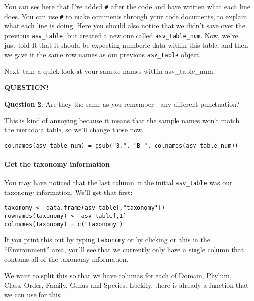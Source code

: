 \documentclass[
]{book}
\newenvironment{bluebox}{
  \definecolor{shadecolor}{RGB}{172, 210, 237}
  \color{white}
  \begin{shaded}}
 {\end{shaded}}
\begin{document}
You can see here that I've added \texttt{\#} after the code and have written what each line does. You can use \texttt{\#} to make comments through your code documents, to explain what each line is doing. Here you should also notice that we didn't save over the previous \texttt{asv\_table}, but created a new one called \texttt{asv\_table\_num}. Now, we've just told R that it should be expecting numberic data within this table, and then we gave it the same row names as our previous \texttt{asv\_table} object.

Next, take a quick look at your sample names within asv\_table\_num.

\begin{bluebox}

\begin{center}
\textbf{QUESTION!}

\end{center}

\textbf{Question 2}: Are they the same as you remember - any different punctuation?

\end{bluebox}

This is kind of annoying because it means that the sample names won't match the metadata table, so we'll change those now.

\begin{verbatim}
colnames(asv_table_num) = gsub("B.", "B-", colnames(asv_table_num))
\end{verbatim}

\paragraph{Get the taxonomy information}\label{get-the-taxonomy-information}

You may have noticed that the last column in the initial \texttt{asv\_table} was our taxonomy information. We'll get that first:

\begin{verbatim}
taxonomy <- data.frame(asv_table[,"taxonomy"])
rownames(taxonomy) <- asv_table[,1]
colnames(taxonomy) = c("taxonomy")
\end{verbatim}

If you print this out by typing \texttt{taxonomy} or by clicking on this in the ``Environment'' area, you'll see that we currently only have a single column that contains all of the taxonomy information.

We want to split this so that we have columns for each of Domain, Phylum, Class, Order, Family, Genus and Species. Luckily, there is already a function that we can use for this:
\end{document}
